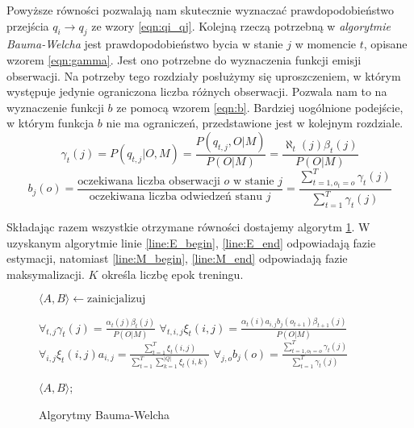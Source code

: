 \documentclass[shortabstract, mgr]{iithesis}
\begin{document}
		Powyższe równości pozwalają nam skutecznie wyznaczać prawdopodobieństwo przejścia $q_i \rightarrow q_j$ ze wzory \ref{eqn:qi_qj}. Kolejną rzeczą potrzebną w \textit{algorytmie Bauma-Welcha} jest prawdopodobieństwo bycia w stanie $j$ w momencie $t$, opisane wzorem \ref{eqn:gamma}. Jest ono potrzebne do wyznaczenia funkcji emisji obserwacji. Na potrzeby tego rozdziały posłużymy się uproszczeniem, w którym występuje jedynie ograniczona liczba różnych obserwacji. Pozwala nam to na wyznaczenie funkcji $b$ ze pomocą wzorem \ref{eqn:b}. Bardziej uogólnione podejście, w którym funkcja $b$ nie ma ograniczeń, przedstawione jest w kolejnym rozdziale.
		\begin{equation}
			\gamma_t(j) = P(q_{t,j}|O,M) = \frac{P(q_{t,j},O|M)}{P(O|M)} = \frac{\aleph_t(j)\beta_t(j)}{P(O|M)}
			\label{eqn:gamma}
		\end{equation}
		\begin{equation}
			b_j(o)=\frac{\text{oczekiwana liczba obserwacji $o$ w stanie $j$}}{\text{oczekiwana liczba odwiedzeń stanu $j$}} = \frac{\sum_{t=1,o_t=o}^T\gamma_t(j)}{\sum_{t=1}^T\gamma_t(j)}
			\label{eqn:b}
		\end{equation}
		
		Składając razem wszystkie otrzymane równości dostajemy algorytm \ref{alg:Baum_Welch}. W uzyskanym algorytmie linie \ref{line:E_begin}, \ref{line:E_end} odpowiadają fazie estymacji, natomiast \ref{line:M_begin}, \ref{line:M_end} odpowiadają fazie maksymalizacji. $K$ określa liczbę epok treningu.
		
		\begin{figure}
			\begin{algorithmic}[1]				
				\STATE $\langle A, B\rangle \leftarrow \text{zainicjalizuj}$
				
					\STATE $\forall_{t,j} \gamma_t(j) = \frac{\alpha_t(j)\beta_t(j)}{P(O|M)} \label{line:E_begin}$
					\STATE $\forall_{t,i,j} \xi_t(i,j) = \frac{\alpha_t(i)a_{i,j}b_j(o_{t+1})\beta_{t+1}(j)}{P(O|M)} \label{line:E_end}$
					\STATE
					\STATE $\forall_{i,j} \xi_t(i,j) a_{i,j} = \frac{\sum_{t=1}^T 	\xi_t(i,j)}{\sum_{t=1}^T \sum_{k=1}^{|Q|}	\xi_t(i,k)} \label{line:M_begin}$
					\STATE $\forall_{j,o} 	b_j(o) = \frac{\sum_{t=1,o_t=o}^T\gamma_t(j)}{\sum_{t=1}^T\gamma_t(j)} \label{line:M_end}$
				\ENDFOR							
				
				\RETURN $\langle A, B\rangle$;
			\end{algorithmic}
	
			\caption{Algorytmy Bauma-Welcha}
			\label{alg:Baum_Welch}
		\end{figure}	
		
\end{document}
